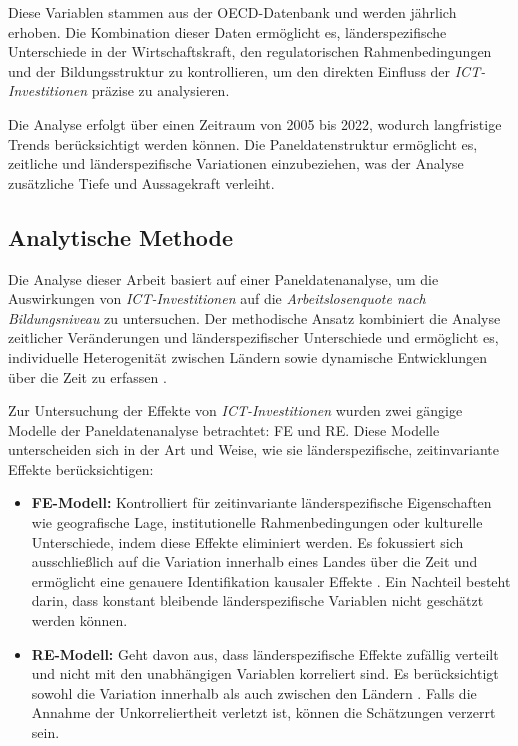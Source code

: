 Diese Variablen stammen aus der \ac{OECD}-Datenbank und werden jährlich erhoben. Die 
Kombination dieser Daten ermöglicht es, länderspezifische Unterschiede in der 
Wirtschaftskraft, den regulatorischen Rahmenbedingungen und der Bildungsstruktur zu 
kontrollieren, um den direkten Einfluss der \textit{\ac{ICT}-Investitionen} präzise zu 
analysieren.

Die Analyse erfolgt über einen Zeitraum von 2005 bis 2022, wodurch langfristige Trends 
berücksichtigt werden können. Die Paneldatenstruktur ermöglicht es, zeitliche und 
länderspezifische Variationen einzubeziehen, was der Analyse zusätzliche Tiefe und 
Aussagekraft verleiht.


\subsection{Analytische Methode}

Die Analyse dieser Arbeit basiert auf einer Paneldatenanalyse, um die Auswirkungen 
von \textit{\ac{ICT}-Investitionen} auf die \textit{Arbeitslosenquote nach Bildungsniveau} 
zu untersuchen. Der methodische Ansatz kombiniert die Analyse zeitlicher Veränderungen und 
länderspezifischer Unterschiede und ermöglicht es, individuelle Heterogenität zwischen 
Ländern sowie dynamische Entwicklungen über die Zeit zu erfassen \parencite{wooldridge2010econometric}.

Zur Untersuchung der Effekte von \textit{\ac{ICT}-Investitionen} wurden zwei gängige 
Modelle der Paneldatenanalyse betrachtet: \ac{FE} und \ac{RE}. Diese Modelle unterscheiden sich 
in der Art und Weise, wie sie länderspezifische, zeitinvariante Effekte berücksichtigen:

\begin{itemize}
    \item \textbf{\ac{FE}-Modell:}  
    Kontrolliert für zeitinvariante länderspezifische Eigenschaften wie 
    geografische Lage, institutionelle Rahmenbedingungen oder kulturelle Unterschiede, 
    indem diese Effekte eliminiert werden. Es fokussiert sich ausschließlich auf die 
    Variation innerhalb eines Landes über die Zeit und ermöglicht eine genauere 
    Identifikation kausaler Effekte \parencite[S. 251–256]{wooldridge2010econometric}. 
    Ein Nachteil besteht darin, dass konstant bleibende länderspezifische Variablen 
    nicht geschätzt werden können.
    
    \item \textbf{\ac{RE}-Modell:}  
    Geht davon aus, dass länderspezifische Effekte zufällig verteilt und nicht mit den 
    unabhängigen Variablen korreliert sind. Es berücksichtigt sowohl die 
    Variation innerhalb als auch zwischen den Ländern \parencite[S. 17–20]{baltagi2021econometric}. 
    Falls die Annahme der Unkorreliertheit verletzt ist, können die Schätzungen verzerrt sein.
\end{itemize}

